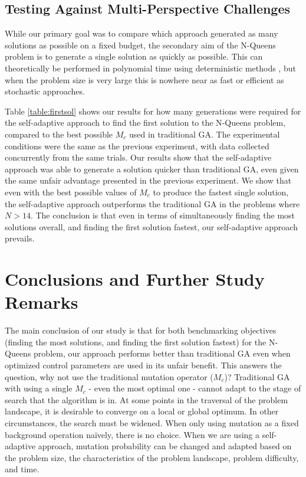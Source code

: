 \documentclass[conference]{IEEEtran}
\begin{document}
\subsection{Testing Against Multi-Perspective Challenges}
While our primary goal was to compare which approach generated as many solutions as possible on a fixed budget, the secondary aim of the N-Queens problem is to generate a single solution as quickly as possible. This can theoretically be performed in polynomial time using deterministic methods \cite{cit:22,cit:23}, but when the problem size is very large this is nowhere near as fast or efficient as stochastic approaches.

Table \ref{table:firstsol} shows our results for how many generations were required for the self-adaptive approach to find the first solution to the N-Queens problem, compared to the best possible $M_{c}$ used in traditional GA. The experimental conditions were the same as the previous experiment, with data collected concurrently from the same trials. Our results show that the self-adaptive approach was able to generate a solution quicker than traditional GA, even given the same unfair advantage presented in the previous experiment. We show that even with the best possible values of $M_{c}$ to produce the fastest single solution, the self-adaptive approach outperforms the traditional GA in the problems where $N > 14$. The conclusion is that even in terms of simultaneously finding the most solutions overall, and finding the first solution fastest, our self-adaptive approach prevails.

\section{Conclusions and Further Study Remarks}
The main conclusion of our study is that for both benchmarking objectives (finding the most solutions, and finding the first solution fastest) for the N-Queens problem, our approach performs better than traditional GA even when optimized control parameters are used in its unfair benefit. This answers the question, why not use the traditional mutation operator ($M_{c}$)? Traditional GA with using a single $M_{c}$ - even the most optimal one - cannot adapt to the stage of search that the algorithm is in. At some points in the traversal of the problem landscape, it is desirable to converge on a local or global optimum. In other circumstances, the search must be widened. When only using mutation as a fixed background operation na\"{i}vely, there is no choice. When we are using a self-adaptive approach, mutation probability can be changed and adapted based on the problem size, the characteristics of the problem landscape, problem difficulty, and time.
\end{document}
